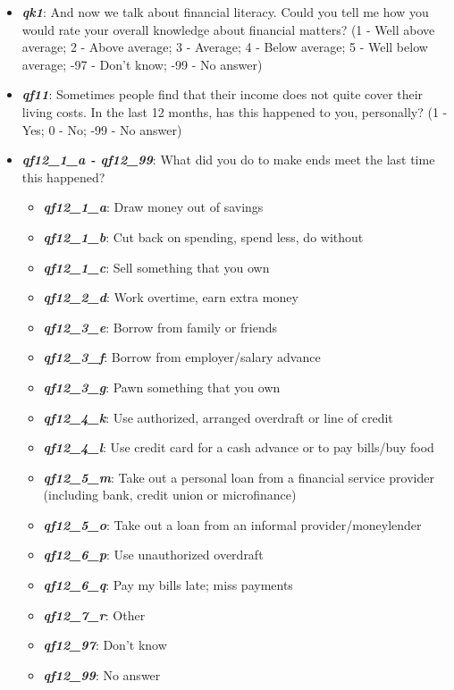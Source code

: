 \documentclass[a4paper,11pt]{article}
\begin{document}
\begin{itemize}
    \item \textit{\textbf{qk1}}: And now we talk about financial literacy. Could you tell me how you would rate your overall knowledge about financial matters? 
    (1 - Well above average; 2 - Above average; 3 - Average; 4 - Below average; 5 - Well below average; -97 - Don't know; -99 - No answer)

    \item \textit{\textbf{qf11}}: Sometimes people find that their income does not quite cover their living costs. In the last 12 months, has this happened to you, personally? 
    (1 - Yes; 0 - No; -99 - No answer)

    \item \textit{\textbf{qf12\_1\_a - qf12\_99}}: What did you do to make ends meet the last time this happened?
    \begin{itemize}
        \item \textit{\textbf{qf12\_1\_a}}: Draw money out of savings
        \item \textit{\textbf{qf12\_1\_b}}: Cut back on spending, spend less, do without
        \item \textit{\textbf{qf12\_1\_c}}: Sell something that you own
        \item \textit{\textbf{qf12\_2\_d}}: Work overtime, earn extra money
        \item \textit{\textbf{qf12\_3\_e}}: Borrow from family or friends
        \item \textit{\textbf{qf12\_3\_f}}: Borrow from employer/salary advance
        \item \textit{\textbf{qf12\_3\_g}}: Pawn something that you own
        \item \textit{\textbf{qf12\_4\_k}}: Use authorized, arranged overdraft or line of credit
        \item \textit{\textbf{qf12\_4\_l}}: Use credit card for a cash advance or to pay bills/buy food
        \item \textit{\textbf{qf12\_5\_m}}: Take out a personal loan from a financial service provider (including bank, credit union or microfinance)
        \item \textit{\textbf{qf12\_5\_o}}: Take out a loan from an informal provider/moneylender
        \item \textit{\textbf{qf12\_6\_p}}: Use unauthorized overdraft
        \item \textit{\textbf{qf12\_6\_q}}: Pay my bills late; miss payments
        \item \textit{\textbf{qf12\_7\_r}}: Other
        \item \textit{\textbf{qf12\_97}}: Don't know
        \item \textit{\textbf{qf12\_99}}: No answer
    \end{itemize}


\end{itemize}
\end{document}
